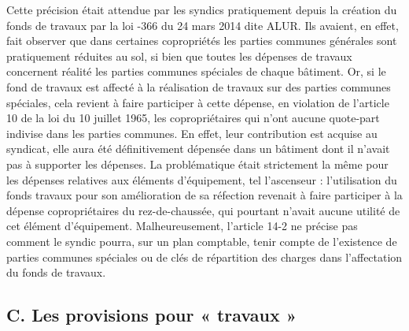 			Cette précision était attendue par les syndics pratiquement depuis la création du fonds de travaux par la loi -366 du 24 mars 2014 dite ALUR. Ils avaient, en effet, fait observer que dans certaines copropriétés les parties communes générales sont pratiquement réduites au sol, si bien que toutes les dépenses de travaux concernent réalité les parties communes spéciales de chaque bâtiment. Or, si le fond de travaux est affecté à la réalisation de travaux sur des parties communes spéciales, cela revient à faire participer à cette dépense, en violation de
			l’article 10 de la loi du 10 juillet 1965, les copropriétaires qui n’ont aucune quote-part indivise dans les parties communes. En effet, leur contribution est acquise au syndicat, elle aura été définitivement dépensée dans un bâtiment dont il n’avait pas à supporter les dépenses. La problématique était strictement la même pour les dépenses relatives aux éléments d’équipement, tel l’ascenseur : l’utilisation du fonds travaux pour son amélioration de sa réfection revenait à faire participer à la dépense copropriétaires du rez-de-chaussée, qui pourtant n’avait aucune utilité de cet élément d’équipement.
			Malheureusement, l’article 14-2 ne précise pas comment le syndic pourra, sur un plan comptable, tenir compte de l’existence de parties communes spéciales ou de clés de répartition des charges dans l’affectation du fonds de travaux.
	
	\subsection{C. Les provisions pour « travaux »}
	
